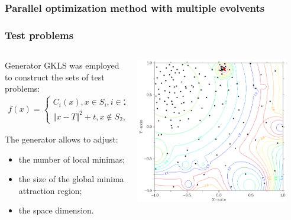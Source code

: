 \documentclass[aspectratio=1610]{beamer}
\begin{document}
\begin{frame}
  \frametitle{Parallel optimization method with multiple evolvents}

\end{frame}

\begin{frame}
  \frametitle{Test problems}
  \begin{columns}
    \begin{column}{0.5\textwidth}
      Generator GKLS was employed to construct the sets of test problems:
      \begin{displaymath}
        \begin{matrix}
          f(x)=
          \left\{
          \begin{matrix}
          C_i(x), x \in S_i, i\in 2,\dots ,m \\
          \Vert x-T \Vert^2 + t, x\not\in S_2,\dots,S_m
          \end{matrix} \right.
        \end{matrix}
      \end{displaymath}

      The generator allows to adjust:
      \begin{itemize}
        \item the number of local minimas;
        \item the size of the global minima attraction region;
        \item the space dimension.
      \end{itemize}
    \end{column}
    \begin{column}{0.5\textwidth}
      \centerline{\includegraphics[width=0.9\textwidth]{gkls_color.png}}
    \end{column}
  \end{columns}
\end{frame}
\end{document}
